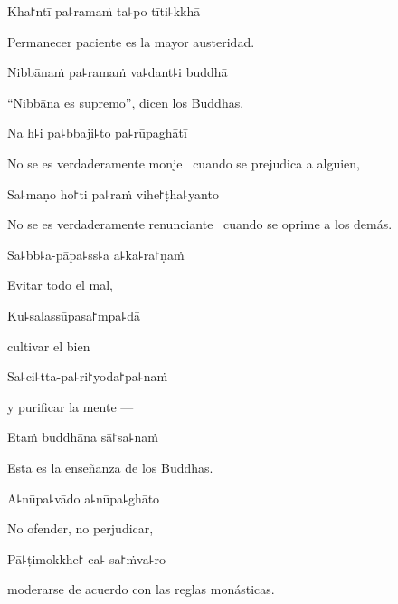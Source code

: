 Kha꜓ntī pa꜕ramaṁ ta꜕po tīti꜕kkhā

\begin{english}
  Permanecer paciente es la mayor austeridad.
\end{english}

Nibbānaṁ pa꜕ramaṁ va꜕dant꜕i buddhā

\begin{english}
  “Nibbāna es supremo”, dicen los Buddhas.
\end{english}

Na h꜕i pa꜕bbaji꜕to pa꜕rūpaghātī

\begin{english}
  No se es verdaderamente monje \pause\ cuando se prejudica a alguien,
\end{english}

Sa꜕maṇo ho꜓ti pa꜕raṁ vihe꜓ṭha꜕yanto

\begin{english}
  No se es verdaderamente renunciante \pause\ cuando se oprime a los demás.
\end{english}

Sa꜕bb꜕a-pāpa꜕ss꜕a a꜕ka꜕ra꜓ṇaṁ

\begin{english}
  Evitar todo el mal,
\end{english}

Ku꜕salassūpasa꜓mpa꜕dā

\begin{english}
  cultivar el bien
\end{english}

Sa꜕ci꜕tta-pa꜕ri꜓yoda꜓pa꜕naṁ

\begin{english}
  y purificar la mente ---
\end{english}

Etaṁ buddhāna sā꜓sa꜕naṁ

\begin{english}
  Esta es la enseñanza de los Buddhas.
\end{english}

A꜕nūpa꜕vādo a꜕nūpa꜕ghāto

\begin{english}
  No ofender, no perjudicar,
\end{english}

Pā꜕ṭimokkhe꜓ ca꜕ sa꜓ṁva꜕ro

\begin{english}
  moderarse de acuerdo con las reglas monásticas.
\end{english}

